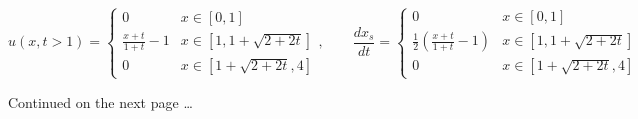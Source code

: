 \begin{adjustwidth}{2.5em}{0pt}
    \vspace{-0.35in}
    \begin{equation*}
        \boxed{u(x, t> 1) = \begin{cases}
            0 & x \in [0,1]\\
            \frac{x+t}{1+t} - 1 & x \in [1,1+\sqrt{2+2t}]\\ 
            0 & x \in [1+\sqrt{2+2t}, 4]
        \end{cases},\qquad \frac{dx_s}{dt} = \begin{cases}
            0 & x \in [0,1]\\
            \frac{1}{2}\left(\frac{x+t}{1+t} - 1\right) & x \in [1,1+\sqrt{2+2t}]\\ 
            0 & x \in [1+\sqrt{2+2t}, 4]
        \end{cases}}
    \end{equation*}

    \vfill 
    Continued on the next page \ldots 
    
\end{adjustwidth}

\pagebreak

